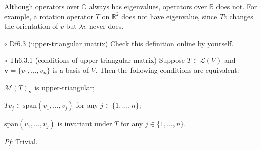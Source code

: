 \documentclass{article}
\begin{document}
\begin{Rmk}{}
    \textcolor{Th}{Although operators over $\mathbb{C}$ always has eigenvalues, operators over $\mathbb{R}$ does not}. For example, a rotation operator $T$ on $\mathbb{R}^2$ does not have eigenvalue, since $Tv$ changes the orientation of $v$ but $\lambda v$ never does.
\end{Rmk}

\begin{Df}{$\circ$ Df6.3 (upper-triangular matrix)}
    Check this definition online by yourself.
\end{Df}

\begin{Th}{$\circ$ Th6.3.1 (conditions of upper-triangular matrix)}
    Suppose $T\in\mathcal{L}(V)$ and $\pmb{v} = \{v_1, \dots, v_n\}$ is a basis of $V$. Then the following conditions are equivalent:
    \begin{compactenum}
        \item $\mathcal{M}(T)_{\pmb{v}}$ is upper-triangular;
        \item $Tv_j\in \text{span}(v_1, \dots, v_j)$ for any $j\in\{1, \dots, n\}$;
        \item $\text{span}(v_1, \dots, v_j)$ is invariant under $T$ for any $j\in\{1, \dots, n\}$.
    \end{compactenum}
    \tcblower
    \textit{Pf}: Trivial.
\end{Th}
\end{document}
